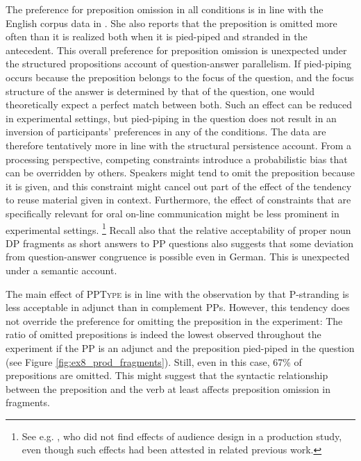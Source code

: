 \largerpage
The preference for preposition omission in all conditions is in line with the English corpus data in \citet{nykiel2017}. She also reports that the preposition is omitted more often than it is realized both when it is pied-piped and stranded in the antecedent. This overall preference for preposition omission is unexpected under the structured propositions account of question-answer parallelism. If pied-piping occurs because the preposition belongs to the focus of the question, and the focus structure of the answer is determined by that of the question, one would theoretically expect a perfect match between both. Such an effect can be reduced in experimental settings, but pied-piping in the question does not result in an inversion of participants' preferences in any of the conditions. The data are therefore tentatively more in line with the structural persistence account. From a processing perspective, competing constraints introduce a probabilistic bias that can be overridden by others. Speakers might tend to omit the preposition because it is given, and this constraint might cancel out part of the effect of the tendency to reuse material given in context. Furthermore, the effect of constraints that are specifically relevant for oral on-line communication might be less prominent in experimental settings.%
%
\footnote{See e.g. \citet{zhan.etal2017}, who did not find effects of audience design in a production study, even though such effects had been attested in related previous work.}\afterfn
%
Recall also that the relative acceptability of proper noun DP fragments as short answers to PP questions \citep{lemkeaccepted} also suggests that some deviation from question-answer congruence is possible even in German. This is unexpected under a semantic account.

\noindent The main effect of \textsc{PPType} is in line with the observation by \citet{vanriemsdijk1978} that P-stranding is less acceptable in adjunct than in complement PPs. However, this tendency does not override the preference for omitting the preposition in the experiment: The ratio of omitted prepositions is indeed the lowest observed throughout the experiment if the PP is an adjunct and the preposition pied-piped in the question (see Figure \ref{fig:ex8_prod_fragments}). Still, even in this case, 67\% of prepositions are omitted. This might suggest that the syntactic relationship between the preposition and the verb at least affects preposition omission in fragments.

